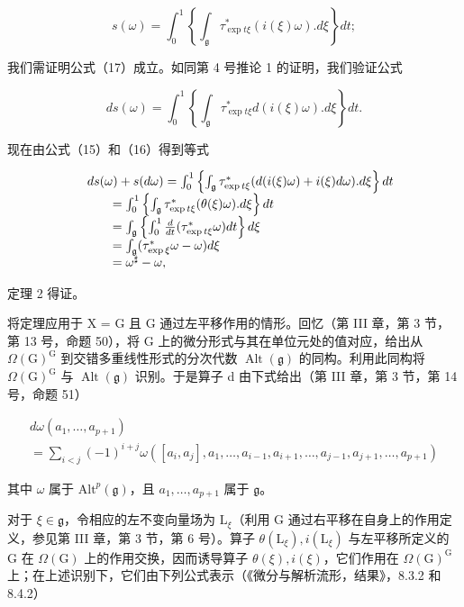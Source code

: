 \[
s (\omega) = \int_ {0} ^ {1} \left\{\int_ {\mathfrak {g}} \tau_ {\exp t \xi} ^ {*} (i (\xi) \omega). d \xi \right\} d t;
\]

我们需证明公式（17）成立。如同第 4 号推论 1 的证明，我们验证公式

\[
d s (\omega) = \int_ {0} ^ {1} \left\{\int_ {\mathfrak {g}} \tau_ {\exp t \xi} ^ {*} d (i (\xi) \omega). d \xi \right\} d t.
\]

现在由公式（15）和（16）得到等式

\[
\begin{array}{r l} & {d s (\omega) + s (d \omega) = \int_ {0} ^ {1} \left\{\int_ {\mathfrak {g}} \tau_ {\exp t \xi} ^ {*} (d (i (\xi) \omega) + i (\xi) d \omega). d \xi \right\} d t} \\ & {\qquad = \int_ {0} ^ {1} \left\{\int_ {\mathfrak {g}} \tau_ {\exp t \xi} ^ {*} (\theta (\xi) \omega). d \xi \right\} d t} \\ & {\qquad = \int_ {\mathfrak {g}} \left\{\int_ {0} ^ {1} \frac {d}{d t} (\tau_ {\exp t \xi} ^ {*} \omega) d t \right\} d \xi} \\ & {\qquad = \int_ {\mathfrak {g}} (\tau_ {\exp \xi} ^ {*} \omega - \omega) d \xi} \\ & {\qquad = \omega^ {\sharp} - \omega ,} \end{array}
\]

定理 2 得证。

将定理应用于 X = G 且 G 通过左平移作用的情形。回忆（第 III 章，第 3 节，第 13 号，命题 50），将 G 上的微分形式与其在单位元处的值对应，给出从 \(\Omega(\mathrm{G})^{\mathrm{G}}\) 到交错多重线性形式的分次代数 \(\operatorname{Alt}(\mathfrak{g})\) 的同构。利用此同构将 \(\Omega(\mathrm{G})^{\mathrm{G}}\) 与 \(\operatorname{Alt}(\mathfrak{g})\) 识别。于是算子 d 由下式给出（第 III 章，第 3 节，第 14 号，命题 51）

\[
\begin{array}{l} d \omega (a _ {1}, \ldots , a _ {p + 1}) \\ = \sum_ {i <   j} (- 1) ^ {i + j} \omega ([ a _ {i}, a _ {j} ], a _ {1}, \ldots , a _ {i - 1}, a _ {i + 1}, \ldots , a _ {j - 1}, a _ {j + 1}, \ldots , a _ {p + 1}) \end{array}
\]

其中 \(\omega\) 属于 \(\mathrm{Alt}^p (\mathfrak{g})\)，且 \(a_1,\ldots ,a_{p + 1}\) 属于 \(\mathfrak{g}\)。

对于 \(\xi \in \mathfrak{g}\)，令相应的左不变向量场为 \(\mathrm{L}_{\xi}\)（利用 G 通过右平移在自身上的作用定义，参见第 III 章，第 3 节，第 6 号）。算子 \(\theta (\mathrm{L}_{\xi}), i(\mathrm{L}_{\xi})\) 与左平移所定义的 G 在 \(\Omega (\mathrm{G})\) 上的作用交换，因而诱导算子 \(\theta (\xi), i(\xi)\)，它们作用在 \(\Omega (\mathrm{G})^{\mathrm{G}}\) 上；在上述识别下，它们由下列公式表示（《微分与解析流形，结果》，8.3.2 和 8.4.2）

